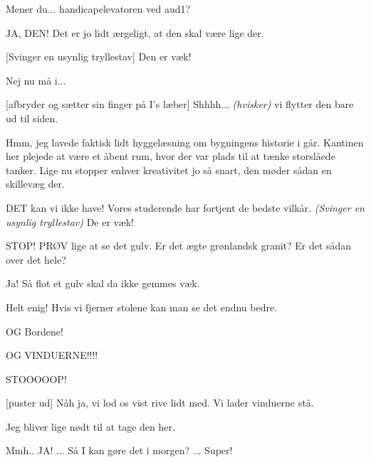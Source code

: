 \documentclass[a4paper,11pt]{article}
\begin{document}
\begin{sketch}
 Mener du... handicapelevatoren ved aud1?

 JA, DEN! Det er jo lidt ærgeligt, at den skal være lige der.

[Svinger en usynlig tryllestav] Den er væk!

 Nej nu må i...

[afbryder og sætter sin finger på I's læber] Shhhh... \textit{(hvisker)} vi flytter den bare ud til siden. 


 Hmm, jeg lavede faktisk lidt hyggelæsning om bygningens historie i går. Kantinen her plejede at være et åbent rum, hvor der var plads til at tænke storslåede tanker. Lige nu stopper enhver kreativitet jo så snart, den møder sådan en skillevæg der.

 DET kan vi ikke have! Vores studerende har fortjent de bedste vilkår. \textit{(Svinger en usynlig tryllestav)} De er væk!


 STOP! PRØV lige at se det gulv. Er det ægte grønlandsk granit? Er det sådan over det hele? 


 Ja! Så flot et gulv skal da ikke gemmes væk.

 Helt enig! Hvis vi fjerner stolene kan man se det endnu bedre.

 OG Bordene!

 OG VINDUERNE!!!!

 STOOOOOP! 


[puster ud] Nåh ja, vi lod os vist rive lidt med. Vi lader vinduerne stå.


 Jeg bliver lige nødt til at tage den her.


 Mmh.. JA! ... Så I kan gøre det i morgen? ... Super!



\end{sketch}
\end{document}
